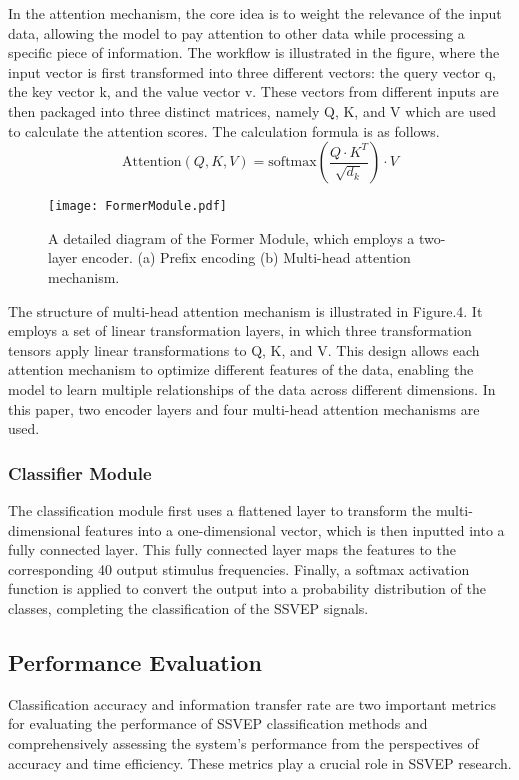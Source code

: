 \documentclass[10pt]{iopart}
\begin{document}
In the attention mechanism, the core idea is to weight the relevance of the input data, allowing the model to pay attention to other data while processing a specific piece of information. The workflow is illustrated in the figure, where the input vector is first transformed into three different vectors: the query vector q, the key vector k, and the value vector v. These vectors from different inputs are then packaged into three distinct matrices, namely Q, K, and V\cite{han2022survey} which are used to calculate the attention scores. The calculation formula is as follows.
\begin{equation}
\text{Attention}(Q,K,V) = \text{softmax}\left(\frac{Q \cdot K^T}{\sqrt{d_k}}\right) \cdot V
\end{equation}
\begin{figure*}[ht]
    \centering
    \texttt{[image: FormerModule.pdf]}
    \caption{A detailed diagram of the Former Module, which employs a two-layer encoder. (a) Prefix encoding (b) Multi-head attention mechanism.}
\end{figure*}
The structure of multi-head attention mechanism is illustrated in Figure.4. It employs a set of linear transformation layers, in which three transformation tensors apply linear transformations to Q, K, and V. This design allows each attention mechanism to optimize different features of the data, enabling the model to learn multiple relationships of the data across different dimensions. In this paper, two encoder layers and four multi-head attention mechanisms are used.
‌\subsubsection{Classifier Module\\}
The classification module first uses a flattened layer to transform the multi-dimensional features into a one-dimensional vector, which is then inputted into a fully connected layer. This fully connected layer maps the features to the corresponding 40 output stimulus frequencies. Finally, a softmax activation function is applied to convert the output into a probability distribution of the classes, completing the classification of the SSVEP signals.
‌\subsection{Performance Evaluation}
Classification accuracy and information transfer rate are two important metrics for evaluating the performance of SSVEP classification methods and comprehensively assessing the system's performance from the perspectives of accuracy and time efficiency. These metrics play a crucial role in SSVEP research.
\end{document}
